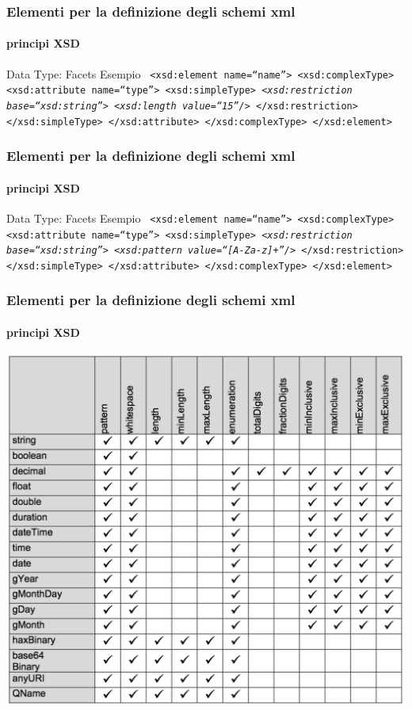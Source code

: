 \begin{frame}
	\frametitle{Elementi per la definizione degli schemi xml}
	\framesubtitle{principi XSD}
	\addtocounter{nframe}{1}

	\begin{block}{Data Type: Facets Esempio}
		\texttt{
			<xsd:element name=``name''>
			<xsd:complexType>
			<xsd:attribute name=``type''>
			<xsd:simpleType>
			\emph{<xsd:restriction base=``xsd:string''>}
			\emph{<xsd:length value=``15''/>}
			</xsd:restriction>
			</xsd:simpleType>
			</xsd:attribute>
			</xsd:complexType>
			</xsd:element>
		}

	\end{block}

\end{frame}

\begin{frame}
	\frametitle{Elementi per la definizione degli schemi xml}
	\framesubtitle{principi XSD}
	\addtocounter{nframe}{1}

	\begin{block}{Data Type: Facets Esempio}
		\texttt{
		<xsd:element name=``name''>
		<xsd:complexType>
		<xsd:attribute name=``type''>
		<xsd:simpleType>
		\emph{<xsd:restriction base=``xsd:string''>}
		\emph{<xsd:pattern value=``[A-Za-z]+''/>}
		</xsd:restriction>
		</xsd:simpleType>
		</xsd:attribute>
		</xsd:complexType>
		</xsd:element>
		}

	\end{block}

\end{frame}

\begin{frame}
	\frametitle{Elementi per la definizione degli schemi xml}
	\framesubtitle{principi XSD}
	\addtocounter{nframe}{1}

	\begin{center}
		\includegraphics[width=.8\textwidth]{imgs/SchemaDataTypeFacets.png}
	\end{center}

\end{frame}



